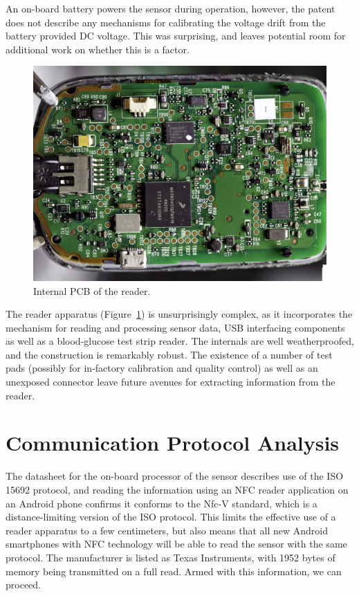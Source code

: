 An on-board battery powers the sensor during operation, however, the patent does not describe any mechanisms for calibrating the voltage drift from the battery provided DC voltage. This was surprising, and leaves potential room for additional work on whether this is a factor.

\begin{figure}[ht]
\centering\includegraphics[width=1.0\linewidth]{images/libre5}
\caption{Internal PCB of the reader\cite{noauthor_type_nodate}.}
\label{fig:libre3}
\end{figure}

The reader apparatus (Figure~\ref{fig:libre3}) is unsurprisingly complex, as it incorporates the mechanism for reading and processing sensor data, USB interfacing components as well as a blood-glucose test strip reader. The internals are well weatherproofed, and the construction is remarkably robust. The existence of a number of test pads (possibly for in-factory calibration and quality control) as well as an unexposed connector leave future avenues for extracting information from the reader.

\section{Communication Protocol Analysis}

The datasheet\cite{noauthor_rf430frl152h_nodate} for the on-board processor of the sensor describes use of the ISO 15692 protocol\cite{noauthor_iso/iec_2017}, and reading the information using an NFC reader application on an Android phone confirms it conforms to the Nfc-V\cite{noauthor_nfcv_nodate} standard, which is a distance-limiting version of the ISO protocol. This limits the effective use of a reader apparatus to a few centimeters\cite{noauthor_nfc_nodate}, but also means that all new Android smartphones with NFC technology will be able to read the sensor with the same protocol. The manufacturer is listed as Texas Instruments, with 1952 bytes of memory being transmitted on a full read. Armed with this information, we can proceed.

